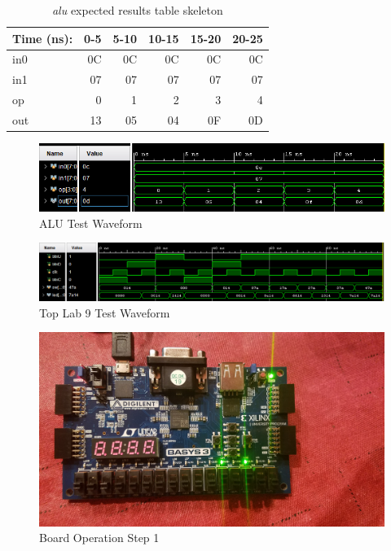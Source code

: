 \documentclass[11pt]{article}
\begin{document}
\begin{table}[ht]\centering
	\caption{\textit{alu} expected results table skeleton}
	\label{ALU:tbl:alu_ERT}\medskip
	\begin{tabular}{l|rrrrr}
		Time (ns): & 0-5 & 5-10 & 10-15 & 15-20 & 20-25 \\
		\midrule
		in0 & 0C & 0C & 0C & 0C & 0C \\
		in1 & 07 & 07 & 07 & 07 & 07 \\
		op	& 0 & 1 & 2 & 3 & 4  \\
		\midrule
		out & 13 & 05 & 04 & 0F & 0D	  \\
		\bottomrule
	\end{tabular}
\end{table}

\begin{figure}[ht]\centering
	\includegraphics[width=1.0\textwidth,trim=0 0mm 0 0,clip]{ALUTest}
	\caption{ALU Test Waveform}
\end{figure}

\begin{figure}[ht]\centering
	\includegraphics[width=1.0\textwidth,trim=0 0mm 0 0,clip]{basys3_lab9}
	\caption{Top Lab 9 Test Waveform}
\end{figure}

\begin{figure}[ht]\centering
	\includegraphics[width=1.0\textwidth,trim=0 10mm 0 0,clip]{Step1}
	\caption{Board Operation Step 1}
\end{figure}
\end{document}
